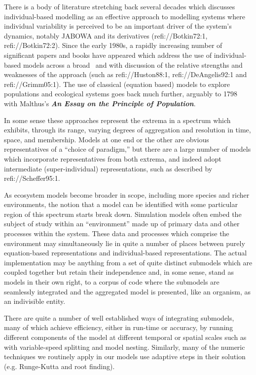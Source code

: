 \documentclass{article}
\newcommand{\tmem}[1]{{\em #1\/}}
\newcommand{\tmstrong}[1]{\textbf{#1}}
\begin{document}
There is a body of literature stretching back several decades which discusses
individual-based modelling as an effective approach to modelling systems where
individual variability is perceived to be an important driver of the system's
dynamics, notably JABOWA and its derivatives (refi://Botkin72:1,
refi://Botkin72:2). Since the early 1980s, a rapidly increasing number of
significant papers and books have appeared which address the use of
individual-based models across a broad \ and with discussion of the relative
strengths and weaknesses of the approach (such as refi://Huston88:1,
refi://DeAngelis92:1 and refi://Grimm05:1). The use of classical (equation
based) models to explore populations and ecological systems goes back much
further, arguably to 1798 with Malthus's {\tmem{{\tmstrong{{\tmstrong{An Essay
on the Principle of Population}}}}}}.

In some sense these approaches represent the extrema in a spectrum which
exhibits, through its range, varying degrees of aggregation and resolution in
time, space, and membership. Models at one end or the other are obvious
representatives of a ``choice of paradigm,'' but there are a large number of
models which incorporate representatives from both extrema, and indeed adopt
intermediate (super-individual) representations, such as described by
refi://Scheffer95:1.

As ecosystem models become broader in scope, including more species and richer
environments, the notion that a model can be identified with some particular
region of this spectrum starts break down. Simulation models often embed the
subject of study within an ``environment'' made up of primary data and other
processes within the system. These data and processes which comprise the
environment may simultaneously lie in quite a number of places between purely
equation-based representations and individual-based representations. The
actual implementation may be anything from a set of quite distinct submodels
which are coupled together but retain their independence and, in some sense,
stand as models in their own right, to a corpus of code where the submodels
are seamlessly integrated and the aggregated model is presented, like an
organism, as an indivisible entity.

There are quite a number of well established ways of integrating submodels,
many of which achieve efficiency, either in run-time or accuracy, by running
different components of the model at different temporal or spatial scales such
as with variable-speed splitting and model nesting. Similarly, many of the
numeric techniques we routinely apply in our models use adaptive steps in
their solution (e.g. Runge-Kutta and root finding).
\end{document}
